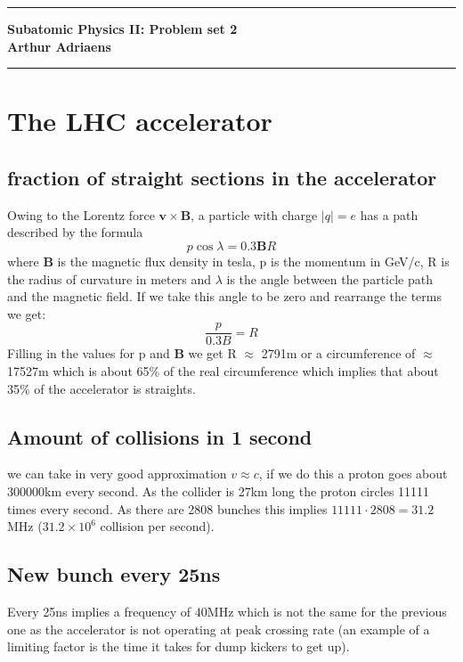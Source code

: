 \documentclass[10pt,a4paper,twoside]{article}
\begin{document}
	\begin{center}
		\hrule
		\vspace{.4cm}
		{\bf {\huge Subatomic Physics II: Problem set 2}}
		\vspace{.2cm}
		\\
		{\bf Arthur Adriaens}
		\vspace{.2cm}
		\hrule
	\end{center}

\section{The LHC accelerator}
\subsection{fraction of straight sections in the accelerator}
Owing to the Lorentz force $\boldsymbol{v}\times\boldsymbol{B}$, a particle with charge $|q| = e$ has a path described by the formula
\begin{equation}
	p\cos{\lambda} = 0.3\boldsymbol{B}R
\end{equation}
where $\boldsymbol{B}$ is the magnetic flux density in tesla, p is the momentum in GeV/c, R is the radius of curvature in meters and $\lambda$ is the angle between the particle path and the magnetic field. If we take this angle to be zero and rearrange the terms we get:
\begin{equation}
	\frac{p}{0.3B} = R
\end{equation}
Filling in the values for p and $\boldsymbol{B}$ we get R $\approx$ 2791m or a circumference of $\approx$ 17527m which is about 65\% of the real circumference which implies that about 35\% of the accelerator is straights.
\subsection{Amount of collisions in 1 second}
we can take in very good approximation $v\approx c$, if we do this a proton goes about 300000km every second. As the collider is 27km long the proton circles 11111 times every second. As there are 2808 bunches this implies $11111\cdot2808=31.2$MHz ($31.2\times10^{6}$ collision per second).
\subsection{New bunch every 25ns}
Every 25ns implies a frequency of $40$MHz which is not the same for the previous one as the accelerator is not operating at peak crossing rate (an example of a limiting factor is the time it takes for dump kickers to get up).
\end{document}
